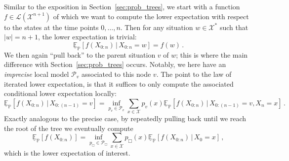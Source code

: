 \documentclass[graybox]{svmult}
\newcommand{\states}{\mathcal{X}}
\newcommand{\gambles}{\mathcal{L}}
\begin{document}
Similar to the exposition in Section~\ref{sec:prob_trees}, we start with a function $f\in\gambles(\states^{n+1})$ of which we want to compute the lower expectation with respect to the states at the time points $0,\ldots,n$. Then for any situation $w\in\states^*$ such that $\lvert w\rvert = n+1$, the lower expectation is trivial:
\begin{equation*}
\underline{\mathbb{E}}_\mathbb{P}\left[f(X_{0:n})\,\big\vert\,X_{0:n}=w\right] = f(w)\,.
\end{equation*}
We then again ``pull back'' to the parent situation $v$ of $w$; this is where the main difference with Section~\ref{sec:prob_trees} occurs. Notably, we here have an \emph{imprecise} local model $\mathcal{P}_v$ associated to this node $v$. The point to the law of iterated lower expectation, is that it suffices to only compute the associated conditional lower expectation locally:
\begin{equation*}
\underline{\mathbb{E}}_\mathbb{P}\left[f(X_{0:n})\,\big\vert\,X_{0:(n-1)}=v\right] = \inf_{p_v\in\mathcal{P}_v} \sum_{x\in\states} p_v(x) \underline{\mathbb{E}}_\mathbb{P}\left[f(X_{0:n})\,\big\vert\,X_{0:(n-1)}=v,X_n=x\right]\,.
\end{equation*}
Exactly analogous to the precise case, by repeatedly pulling back until we reach the root of the tree we eventually compute
\begin{equation*}
\underline{\mathbb{E}}_\mathbb{P}\left[ f(X_{0:n})\right] = \inf_{p_\Box\in\mathcal{P}_\Box} \sum_{x\in\states} p_\Box(x) \underline{\mathbb{E}}_\mathbb{P}\left[ f(X_{0:n})\,\big\vert\,X_0=x\right]\,,
\end{equation*}
which is the lower expectation of interest.
\end{document}
